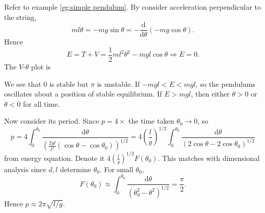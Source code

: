 \begin{example}[Pendulum]
    Refer to example \ref{eg:simple pendulum}. By consider acceleration perpendicular to the string,
    \[
        ml \ddot{\theta} = -mg \sin \theta = - \frac{\mathrm{d}}{\mathrm{d}\theta}(-mg \cos \theta) .
    \]
    Hence 
    \[
        E=T+V = \frac{1}{2}ml^2 \theta^2-mgl \cos \theta \Longrightarrow \dot{E}=0.
    \]
    The $V$-$\theta$ plot is
    \begin{center}
      \end{center} 
      We see that $ 0 $ is stable but $ \pi $ is unstable. If $ -mgl<E<mgl $, so the pendulums oscillates about a position of stable equilibrium. If $E>mgl$, then either $ \dot{\theta}>0 $ or $ \dot{\theta}<0 $ for all time.

      Now consider its period. Since $ p = 4\times $ the time taken $ \theta_0\to 0 $, so 
      \[
        p = 4 \int_{0}^{\theta_0} \frac{\mathrm{d}\theta}{\left( \frac{2gl}{l^2}(\cos \theta-\cos \theta_0) \right)^{1/2}} = 4 \left( \frac{l}{g} \right)^{1/2}\int_{0}^{\theta_0} \frac{\mathrm{d}\theta}{\left( 2\cos \theta-2\cos \theta_0 \right)^{1/2}}
      \]
      from energy equation. Denote it $ 4\left( \frac{l}{g} \right)^{1/2} F(\theta_0) $. This matches with dimensional analysis since $d,l$ determine $\theta_0$. For small $ \theta_0 $,
      \[
          F(\theta_0) \approx \int_{0}^{\theta_0} \frac{\mathrm{d}\theta}{(\theta_0^2-\theta^2)^{1/2}} = \frac{\pi}{2}.
      \]
      Hence $ p \approx 2\pi\sqrt{l/g} $.
\end{example}

